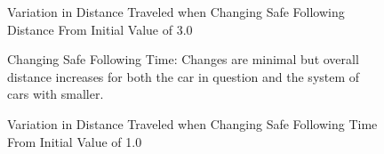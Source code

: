 \documentclass[12pt]{article}
\begin{document}
\begin{figure}[H]
  \centering
  \caption{Variation in Distance Traveled when Changing Safe Following Distance From Initial Value of 3.0}
\end{figure}

\begin{figure}[H]
  \centering
  \caption{Changing Safe Following Time: Changes are minimal but overall distance increases for both the car in question and the system of cars with smaller.}
\end{figure}

\begin{figure}[H]
  \centering
  \caption{Variation in Distance Traveled when Changing Safe Following Time From Initial Value of 1.0}
\end{figure}
\end{document}
